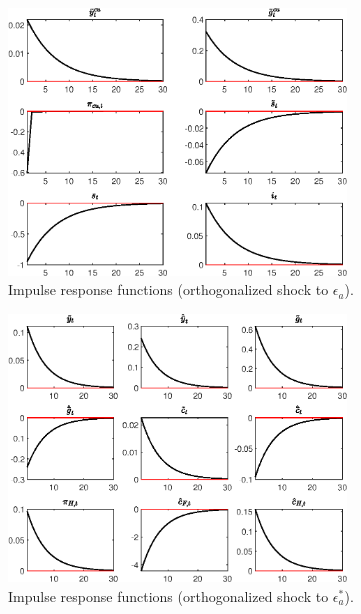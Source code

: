 \begin{figure}[H]
\centering 
\includegraphics[width=0.80\textwidth]{MODEL_MAIN_3/graphs/MODEL_MAIN_3_IRF_eps_a3}
\caption{Impulse response functions (orthogonalized shock to ${\epsilon_a}$).}\label{Fig:IRF:eps_a:3}
\end{figure}
 
\begin{figure}[H]
\centering 
\includegraphics[width=0.80\textwidth]{MODEL_MAIN_3/graphs/MODEL_MAIN_3_IRF_eps_a_starr1}
\caption{Impulse response functions (orthogonalized shock to ${\epsilon_a^*}$).}\label{Fig:IRF:eps_a_starr:1}
\end{figure}
 

